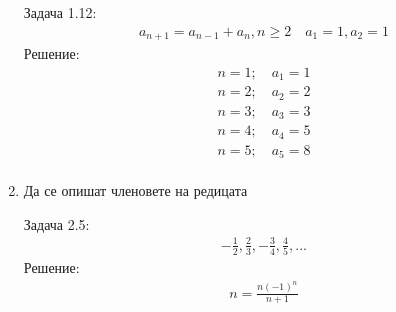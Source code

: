 \documentclass[a4paper, 20pt, fleqn, border=2pt]{article}
\begin{document}
\begin{enumerate}
\par
\par

Задача 1.12:
\begin{equation}
\begin{split}
    a_{n+1} = a_{n-1}+a_{n}, n \geq 2 \quad a_{1} = 1, a_{2} = 1
\end{split}
\end{equation}
Решение:
\begin{equation}
\begin{split}
    n = 1;\quad a_{1} = 1 \\
    n = 2;\quad a_{2} = 2 \\
    n = 3;\quad a_{3} = 3 \\
    n = 4;\quad a_{4} = 5 \\
    n = 5;\quad a_{5} = 8 \\
\end{split}
\end{equation}

\par


\par

    \item Да се опишат членовете на редицата
\par
\par

Задача 2.5:
\begin{equation}
\begin{split}
    -\frac{1}{2},\frac{2}{3},-\frac{3}{4},\frac{4}{5},...
\end{split}
\end{equation}
Решение:
\begin{equation}
\begin{split}
    n = \frac{n(-1)^n}{n+1}
\end{split}
\end{equation}


\end{enumerate}
\end{document}
